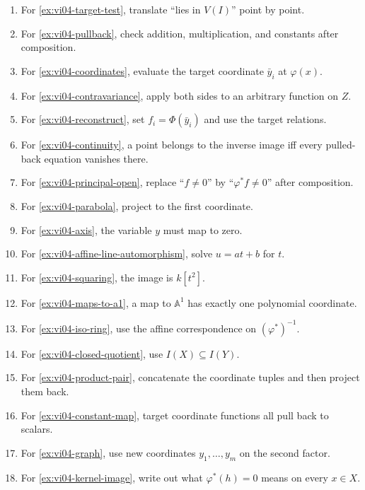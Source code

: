 \begin{enumerate}[label=\textbf{E\arabic*.},leftmargin=*,itemsep=0.6em]
\item For \cref{ex:vi04-target-test}, translate ``lies in \(V(I)\)'' point by point.
\item For \cref{ex:vi04-pullback}, check addition, multiplication, and constants after composition.
\item For \cref{ex:vi04-coordinates}, evaluate the target coordinate \(\bar y_i\) at \(\varphi(x)\).
\item For \cref{ex:vi04-contravariance}, apply both sides to an arbitrary function on \(Z\).
\item For \cref{ex:vi04-reconstruct}, set \(f_i=\Phi(\bar y_i)\) and use the target relations.
\item For \cref{ex:vi04-continuity}, a point belongs to the inverse image iff every pulled-back equation vanishes there.
\item For \cref{ex:vi04-principal-open}, replace ``\(f\neq0\)'' by ``\(\varphi^*f\neq0\)'' after composition.
\item For \cref{ex:vi04-parabola}, project to the first coordinate.
\item For \cref{ex:vi04-axis}, the variable \(y\) must map to zero.
\item For \cref{ex:vi04-affine-line-automorphism}, solve \(u=at+b\) for \(t\).
\item For \cref{ex:vi04-squaring}, the image is \(k[t^2]\).
\item For \cref{ex:vi04-maps-to-a1}, a map to \(\mathbb A^1\) has exactly one polynomial coordinate.
\item For \cref{ex:vi04-iso-ring}, use the affine correspondence on \((\varphi^*)^{-1}\).
\item For \cref{ex:vi04-closed-quotient}, use \(I(X)\subseteq I(Y)\).
\item For \cref{ex:vi04-product-pair}, concatenate the coordinate tuples and then project them back.
\item For \cref{ex:vi04-constant-map}, target coordinate functions all pull back to scalars.
\item For \cref{ex:vi04-graph}, use new coordinates \(y_1,\dots,y_m\) on the second factor.
\item For \cref{ex:vi04-kernel-image}, write out what \(\varphi^*(h)=0\) means on every \(x\in X\).
\end{enumerate}
